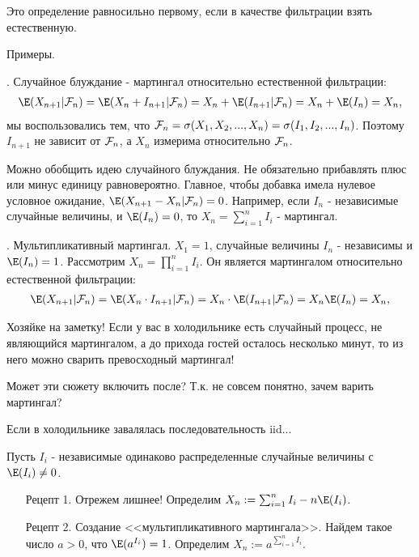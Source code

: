 {Это определение равносильно первому, если в качестве фильтрации взять естественную.


Примеры.

\begin{myex}. Случайное блуждание - мартингал относительно естественной фильтрации:
\begin{multline}
\E(X_{n+1}|\F_{n})=\E(X_{n}+I_{n+1}|\F_{n})=X_{n}+\E(I_{n+1}|\F_{n})=X_{n}+\E(I_{n})=X_{n},
\end{multline}
мы воспользовались тем, что $\mathcal{F}_{n}=\sigma(X_{1},X_{2},...,X_{n})=\sigma(I_{1},I_{2},...,I_{n})$. Поэтому $I_{n+1}$ не зависит от $\mathcal{F}_{n}$, а $X_{n}$ измерима относительно $\mathcal{F}_{n}$.
\end{myex}

Можно обобщить идею случайного блуждания. Не обязательно прибавлять плюс или минус единицу равновероятно. Главное, чтобы добавка имела нулевое условное ожидание, $\E(X_{n+1}-X_{n}|\F_{n})=0$. Например, если $I_{n}$ - независимые случайные величины, и $\E(I_{n})=0$, то $X_{n}=\sum_{i=1}^{n}I_{i}$ - мартингал.


\begin{myex}. Мультипликативный мартингал. $X_{1}=1$, случайные величины $I_{n}$ - независимы и $\E(I_{n})=1$. Рассмотрим $X_{n}=\prod_{i=1}^{n} I_{i}$. Он является мартингалом относительно естественной фильтрации:
\begin{multline}
\E(X_{n+1}|\F_{n})=\E(X_{n}\cdot I_{n+1}|\F_{n})=X_{n}\cdot \E(I_{n+1}|\F_{n})=X_{n}\E(I_{n})=X_{n},
\end{multline}
\end{myex}

Хозяйке на заметку! Если у вас в холодильнике есть случайный процесс, не являющийся мартингалом, а до прихода гостей осталось несколько минут, то из него можно сварить превосходный мартингал!

Может эти сюжету включить после? Т.к. не совсем понятно, зачем варить мартингал?


Если в холодильнике завалялась последовательность iid...

Пусть $I_{i}$ - независимые одинаково распределенные случайные величины с $\E(I_{i})\neq 0$.

\begin{itemize}
\item[Рецепт 1.] Отрежем лишнее! Определим $X_{n}:=\sum_{i=1}^{n} I_{i}-n\E(I_{i})$.
\item[Рецепт 2.] Создание <<мультипликативного мартингала>>. Найдем такое число $a>0$, что $\E(a^{I_{i}})=1$. Определим $X_{n}:=a^{\sum_{i=1}^{n}I_{i}}$.
\end{itemize}

}
